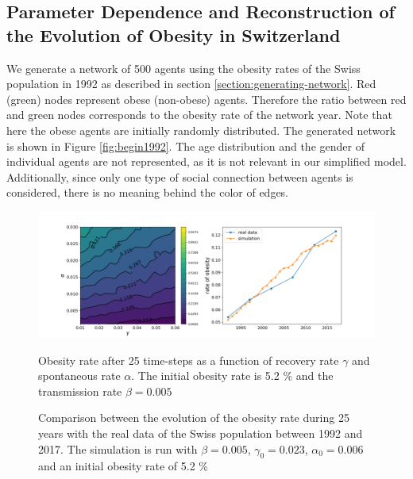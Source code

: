\documentclass[11pt]{article}
\begin{document}
\FloatBarrier

\subsection{Parameter Dependence and Reconstruction of the Evolution of Obesity in Switzerland}

We generate a network of 500 agents using the obesity rates of the Swiss population in 1992 \cite{bmistatistics} as described in section \ref{section:generating-network}. Red (green) nodes represent obese (non-obese) agents. Therefore the ratio between red and green nodes corresponds to the obesity rate of the network year. Note that here the obese agents are initially randomly distributed.
The generated network is shown in Figure \ref{fig:begin1992}. The age distribution and the gender of individual agents are not represented, as it is not relevant in our simplified model. Additionally, since only one type of social connection between agents is considered, there is no meaning behind the color of edges. \\

\begin{figure}
    \centering
    \includegraphics[width=\linewidth]{figures/parameters-25y.png}
\begin{minipage}[t]{.45\linewidth}
    \caption{\label{fig:parameters-25y} Obesity rate after 25 time-steps as a function of recovery rate $\gamma$ and spontaneous rate $\alpha$. The initial obesity rate is 5.2 \% and the transmission rate $\beta=0.005$}
\end{minipage}%
\hfill%
\begin{minipage}[t]{.45\linewidth}
    \caption{\label{fig:comparison} Comparison between the evolution of the obesity rate during 25 years with the real data of the Swiss population between 1992 and 2017. The simulation is run with $\beta = 0.005 $, $\gamma_0 = 0.023$, $\alpha_0 = 0.006$ and an initial obesity rate of 5.2 \%}
\end{minipage}%
\end{figure}
\end{document}
